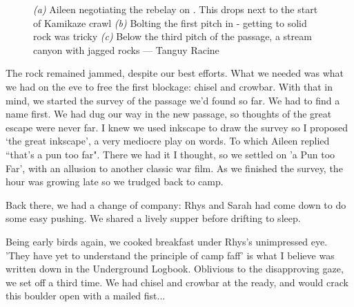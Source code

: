 \begin{figure}[t!]
\checkoddpage \ifoddpage \forcerectofloat \else \forceversofloat \fi
\centering
    \begin{subfigure}[t]{0.316\textwidth}
        \centering
        \caption{} \label{Bolting a Pun Too Far}
    \end{subfigure}
\hfill    
\begin{subfigure}[t]{0.674\textwidth}
    \centering
        \caption{} \label{Canyon of A Pun Too Far}
    \end{subfigure}
    \begin{subfigure}[t]{\textwidth}
\centering
{}
 \caption{}\label{milka pitch}
\end{subfigure}
    \caption{
    \emph{(a)} Aileen negotiating the rebelay on \protect{}. This drops next to the start of Kamikaze crawl
    \emph{(b)} Bolting the first pitch in \protect{} - getting to solid rock was tricky
    \emph{(c)} Below the third pitch of the passage, a stream canyon with jagged rocks --- Tanguy Racine }
\end{figure}

The rock remained jammed, despite our best efforts. What we needed was what we had on the eve to free the first blockage: chisel and crowbar. With that in mind, we started the survey of the passage we'd found so far. We had to find a name first. We had dug our way in the new passage, so thoughts of the great escape were never far. I knew we used inkscape to draw the survey so I proposed `the great inkscape', a very mediocre play on words. To which Aileen replied ``that's a pun too far". There we had it I thought, so we settled on 'a Pun too Far', with an allusion to another classic war film. As we finished the survey, the hour was growing late so we trudged back to camp.

Back there, we had a change of company: Rhys and Sarah had come down to do some easy pushing. We shared a lively supper before drifting to sleep.

Being early birds again, we cooked breakfast under Rhys's unimpressed eye. 'They have yet to understand the principle of camp faff' is what I believe was written down in the Underground Logbook. Oblivious to the disapproving gaze, we set off a third time. We had chisel and crowbar at the ready, and would crack this boulder open with a mailed fist...

